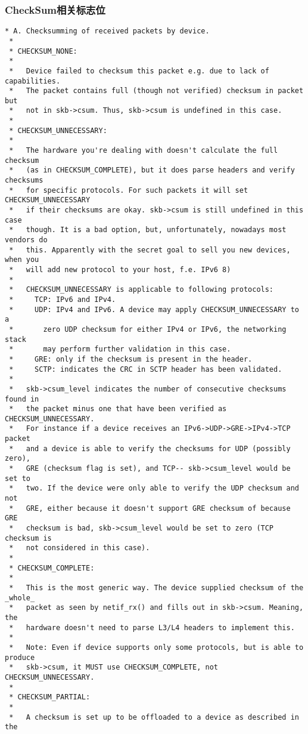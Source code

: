 			\subsubsection{CheckSum相关标志位}
\begin{verbatim}
* A. Checksumming of received packets by device.
 *
 * CHECKSUM_NONE:
 *
 *   Device failed to checksum this packet e.g. due to lack of capabilities.
 *   The packet contains full (though not verified) checksum in packet but
 *   not in skb->csum. Thus, skb->csum is undefined in this case.
 *
 * CHECKSUM_UNNECESSARY:
 *
 *   The hardware you're dealing with doesn't calculate the full checksum
 *   (as in CHECKSUM_COMPLETE), but it does parse headers and verify checksums
 *   for specific protocols. For such packets it will set CHECKSUM_UNNECESSARY
 *   if their checksums are okay. skb->csum is still undefined in this case
 *   though. It is a bad option, but, unfortunately, nowadays most vendors do
 *   this. Apparently with the secret goal to sell you new devices, when you
 *   will add new protocol to your host, f.e. IPv6 8)
 *
 *   CHECKSUM_UNNECESSARY is applicable to following protocols:
 *     TCP: IPv6 and IPv4.
 *     UDP: IPv4 and IPv6. A device may apply CHECKSUM_UNNECESSARY to a
 *       zero UDP checksum for either IPv4 or IPv6, the networking stack
 *       may perform further validation in this case.
 *     GRE: only if the checksum is present in the header.
 *     SCTP: indicates the CRC in SCTP header has been validated.
 *
 *   skb->csum_level indicates the number of consecutive checksums found in
 *   the packet minus one that have been verified as CHECKSUM_UNNECESSARY.
 *   For instance if a device receives an IPv6->UDP->GRE->IPv4->TCP packet
 *   and a device is able to verify the checksums for UDP (possibly zero),
 *   GRE (checksum flag is set), and TCP-- skb->csum_level would be set to
 *   two. If the device were only able to verify the UDP checksum and not
 *   GRE, either because it doesn't support GRE checksum of because GRE
 *   checksum is bad, skb->csum_level would be set to zero (TCP checksum is
 *   not considered in this case).
 *
 * CHECKSUM_COMPLETE:
 *
 *   This is the most generic way. The device supplied checksum of the _whole_
 *   packet as seen by netif_rx() and fills out in skb->csum. Meaning, the
 *   hardware doesn't need to parse L3/L4 headers to implement this.
 *
 *   Note: Even if device supports only some protocols, but is able to produce
 *   skb->csum, it MUST use CHECKSUM_COMPLETE, not CHECKSUM_UNNECESSARY.
 *
 * CHECKSUM_PARTIAL:
 *
 *   A checksum is set up to be offloaded to a device as described in the

\end{verbatim}
